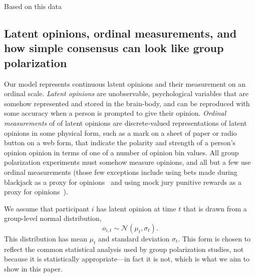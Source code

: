 \documentclass[11pt, letterpaper]{article}
\begin{document}
Based on this data



\subsection{Latent opinions, ordinal measurements, and how simple consensus can look like
group polarization}

Our model represents continuous latent opinions and their 
measurement on an ordinal scale. \emph{Latent opinions} are 
unobservable, psychological variables that are 
somehow represented and stored in the brain-body, and can be reproduced with
some accuracy when a person is prompted to give their opinion. 
\emph{Ordinal measurements} of 
of latent opinions are discrete-valued representations of latent opinions 
in some physical form, such as a mark on a sheet of paper or radio button on a web form, that
indicate the polarity and strength of a person's opinion opinion in terms of
one of a number of opinion bin values. All group polarization experiments must somehow
measure opinions, and all but a few use ordinal measurements (those few exceptions include
using bets made during blackjack as a proxy for opinions~\cite{Blascovich1973,Blascovich1975,Blascovich1976}
and using mock jury punitive rewards as a proxy for opinions~\cite{Schkade2000}).


We assume that participant $i$ has latent opinion at time $t$ that is drawn from
a group-level normal distribution,
\begin{equation}
  o_{i,t} \sim \mathcal{N}(\mu_t, \sigma_t).
  \label{eq:opinionDistribution}
\end{equation}
\noindent 
This distribution has mean $\mu_t$ and standard deviation $\sigma_t$.
This form is chosen to
reflect the common statistical analysis used by group polarization studies,
not because it is statistically appropriate---in fact it is not, which is what
we aim to show in this paper.
\end{document}
